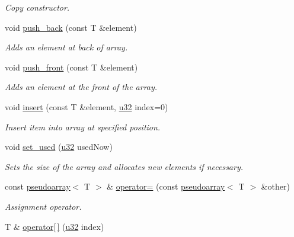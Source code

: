 \begin{DoxyCompactItemize}
\begin{DoxyCompactList}\small\item\em Copy constructor. \end{DoxyCompactList}\item 
void \hyperlink{classirr_1_1core_1_1pseudoarray_a64254a230836a5cf6ebc68917333613e}{push\+\_\+back} (const T \&element)
\begin{DoxyCompactList}\small\item\em Adds an element at back of array. \end{DoxyCompactList}\item 
void \hyperlink{classirr_1_1core_1_1pseudoarray_a0971acf89d90a44dc0b668ba5a8fda80}{push\+\_\+front} (const T \&element)
\begin{DoxyCompactList}\small\item\em Adds an element at the front of the array. \end{DoxyCompactList}\item 
void \hyperlink{classirr_1_1core_1_1pseudoarray_a170e5bbb017e369f2bc35312c36bcd5d}{insert} (const T \&element, \hyperlink{namespaceirr_a0416a53257075833e7002efd0a18e804}{u32} index=0)
\begin{DoxyCompactList}\small\item\em Insert item into array at specified position. \end{DoxyCompactList}\item 
void \hyperlink{classirr_1_1core_1_1pseudoarray_ace4c1c83d532b76111e72d499fc10083}{set\+\_\+used} (\hyperlink{namespaceirr_a0416a53257075833e7002efd0a18e804}{u32} used\+Now)
\begin{DoxyCompactList}\small\item\em Sets the size of the array and allocates new elements if necessary. \end{DoxyCompactList}\item 
const \hyperlink{classirr_1_1core_1_1pseudoarray}{pseudoarray}$<$ T $>$ \& \hyperlink{classirr_1_1core_1_1pseudoarray_ad88ccc4ac554cf2e15f50a2b6ce342e3}{operator=} (const \hyperlink{classirr_1_1core_1_1pseudoarray}{pseudoarray}$<$ T $>$ \&other)\hypertarget{classirr_1_1core_1_1pseudoarray_ad88ccc4ac554cf2e15f50a2b6ce342e3}{}\label{classirr_1_1core_1_1pseudoarray_ad88ccc4ac554cf2e15f50a2b6ce342e3}

\begin{DoxyCompactList}\small\item\em Assignment operator. \end{DoxyCompactList}\item 
T \& \hyperlink{classirr_1_1core_1_1pseudoarray_acd345edb852a782d19905c6d016551db}{operator\mbox{[}$\,$\mbox{]}} (\hyperlink{namespaceirr_a0416a53257075833e7002efd0a18e804}{u32} index)\hypertarget{classirr_1_1core_1_1pseudoarray_acd345edb852a782d19905c6d016551db}{}\label{classirr_1_1core_1_1pseudoarray_acd345edb852a782d19905c6d016551db}


\end{DoxyCompactItemize}
